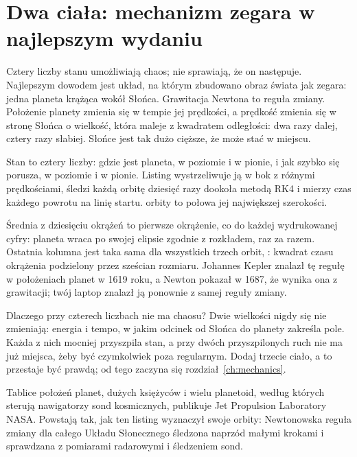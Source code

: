 \section{Dwa ciała: mechanizm zegara w najlepszym wydaniu}
\label{sec:ch04-planets}

\noindent
Cztery liczby stanu umożliwiają chaos; nie sprawiają, że on następuje.
Najlepszym dowodem jest układ, na którym zbudowano obraz świata jak zegara:
jedna planeta krążąca wokół Słońca. Grawitacja Newtona to reguła zmiany.
Położenie planety zmienia się w tempie jej prędkości, a prędkość zmienia się
w stronę Słońca o wielkość, która maleje z kwadratem odległości: dwa razy
dalej, cztery razy słabiej. Słońce jest tak dużo cięższe, że może stać w
miejscu.


\noindent
Stan to cztery liczby: gdzie jest planeta, w poziomie i w pionie, i jak
szybko się porusza, w poziomie i w pionie. Listing wystrzeliwuje ją w bok z
 różnymi prędkościami, śledzi każdą orbitę dziesięć
razy dookoła metodą RK4 i mierzy czas każdego powrotu na linię startu.
 orbity to połowa jej największej szerokości.


\noindent
Średnia z dziesięciu okrążeń to pierwsze okrążenie, co do każdej wydrukowanej
cyfry: planeta wraca po swojej elipsie zgodnie z rozkładem, raz za razem.
Ostatnia kolumna jest taka sama dla wszystkich trzech orbit,
: kwadrat czasu okrążenia podzielony przez sześcian
rozmiaru. Johannes Kepler znalazł tę regułę w położeniach planet w 1619 roku,
a Newton pokazał w 1687, że wynika ona z grawitacji; twój laptop znalazł ją
ponownie z samej reguły zmiany.

Dlaczego przy czterech liczbach nie ma chaosu? Dwie wielkości nigdy się nie
zmieniają: energia i tempo, w jakim odcinek od Słońca do planety zakreśla
pole. Każda z nich mocniej przyszpila stan, a przy dwóch przyszpilonych ruch
nie ma już miejsca, żeby być czymkolwiek poza regularnym. Dodaj trzecie
ciało, a to przestaje być prawdą; od tego zaczyna się
rozdział~\ref{ch:mechanics}.

\begin{worldbox}
Tablice położeń planet, dużych księżyców i wielu planetoid, według których
sterują nawigatorzy sond kosmicznych, publikuje Jet Propulsion Laboratory
NASA. Powstają tak, jak ten listing wyznaczył swoje orbity: Newtonowska
reguła zmiany dla całego Układu Słonecznego śledzona naprzód małymi krokami i
sprawdzana z pomiarami radarowymi i śledzeniem sond.
\end{worldbox}

